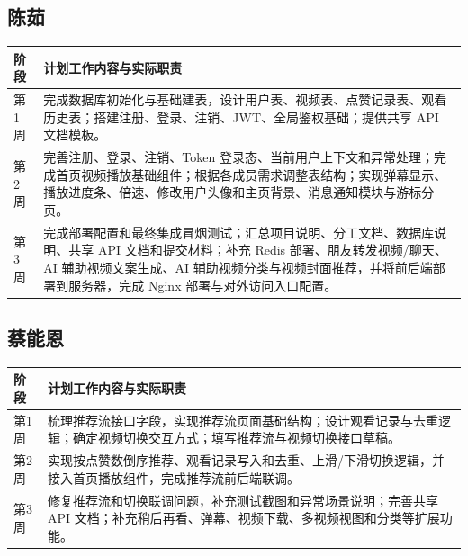 \documentclass[UTF8,a4paper,12pt,fontset=fandol]{ctexart}
\begin{document}
\subsection{陈茹}
\begin{table}[H]
\centering
\small
\begin{tabularx}{\textwidth}{p{1.7cm} X}
\toprule
阶段 & 计划工作内容与实际职责 \\
\midrule
第1周 & 完成数据库初始化与基础建表，设计用户表、视频表、点赞记录表、观看历史表；搭建注册、登录、注销、JWT、全局鉴权基础；提供共享 API 文档模板。 \\
第2周 & 完善注册、登录、注销、Token 登录态、当前用户上下文和异常处理；完成首页视频播放基础组件；根据各成员需求调整表结构；实现弹幕显示、播放进度条、倍速、修改用户头像和主页背景、消息通知模块与游标分页。 \\
第3周 & 完成部署配置和最终集成冒烟测试；汇总项目说明、分工文档、数据库说明、共享 API 文档和提交材料；补充 Redis 部署、朋友转发视频/聊天、AI 辅助视频文案生成、AI 辅助视频分类与视频封面推荐，并将前后端部署到服务器，完成 Nginx 部署与对外访问入口配置。 \\
\bottomrule
\end{tabularx}
\normalsize
\end{table}

\subsection{蔡能恩}
\begin{table}[H]
\centering
\small
\begin{tabularx}{\textwidth}{p{1.7cm} X}
\toprule
阶段 & 计划工作内容与实际职责 \\
\midrule
第1周 & 梳理推荐流接口字段，实现推荐流页面基础结构；设计观看记录与去重逻辑；确定视频切换交互方式；填写推荐流与视频切换接口草稿。 \\
第2周 & 实现按点赞数倒序推荐、观看记录写入和去重、上滑/下滑切换逻辑，并接入首页播放组件，完成推荐流前后端联调。 \\
第3周 & 修复推荐流和切换联调问题，补充测试截图和异常场景说明；完善共享 API 文档；补充稍后再看、弹幕、视频下载、多视频视图和分类等扩展功能。 \\
\bottomrule
\end{tabularx}
\normalsize
\end{table}
\end{document}
